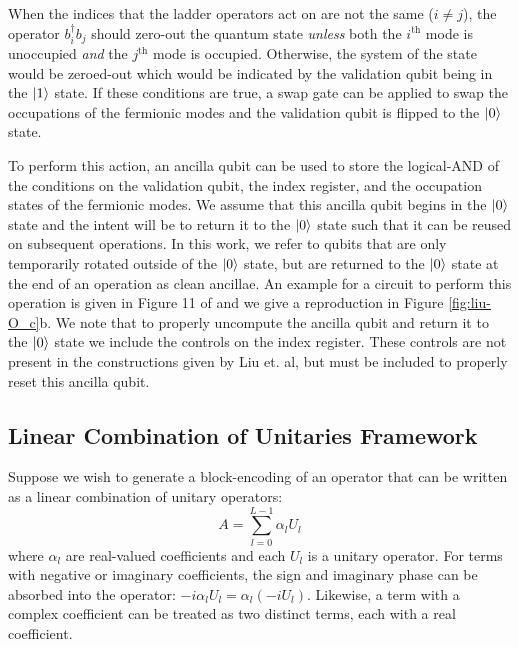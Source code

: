 When the indices that the ladder operators act on are not the same ($i \neq j$), the operator $b_i^\dagger b_j$ should zero-out the quantum state \textit{unless} both the $i^\text{th}$ mode is unoccupied \textit{and} the $j^\text{th}$ mode is occupied.
Otherwise, the system of the state would be zeroed-out which would be indicated by the validation qubit being in the $\ket{1}$ state.
If these conditions are true, a swap gate can be applied to swap the occupations of the fermionic modes and the validation qubit is flipped to the $\ket{0}$ state. 

To perform this action, an ancilla qubit can be used to store the logical-AND of the conditions on the validation qubit, the index register, and the occupation states of the fermionic modes.
We assume that this ancilla qubit begins in the $\ket{0}$ state and the intent will be to return it to the $\ket{0}$ state such that it can be reused on subsequent operations.
In this work, we refer to qubits that are only temporarily rotated outside of the $\ket{0}$ state, but are returned to the $\ket{0}$ state at the end of an operation as clean ancillae.
An example for a circuit to perform this operation is given in Figure 11 of \cite{liu2024efficient} and we give a reproduction in Figure \ref{fig:liu-O_c}b.
We note that to properly uncompute the ancilla qubit and return it to the $\ket{0}$ state we include the controls on the index register.
These controls are not present in the constructions given by Liu et. al, but must be included to properly reset this ancilla qubit.

\subsection{Linear Combination of Unitaries Framework}
\label{subsec:lcu}

Suppose we wish to generate a block-encoding of an operator that can be written as a linear combination of unitary operators:
\begin{equation}
    \label{eq:lcu}
    A = \sum_{l=0}^{L-1} \alpha_l U_l
\end{equation}
where $\alpha_l$ are real-valued coefficients and each $U_l$ is a unitary operator.
For terms with negative or imaginary coefficients, the sign and imaginary phase can be absorbed into the operator: $-i \alpha_l U_l = \alpha_l (-i U_l)$.
Likewise, a term with a complex coefficient can be treated as two distinct terms, each with a real coefficient.

